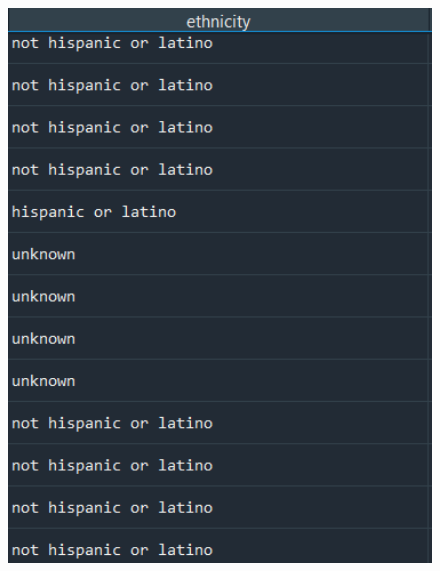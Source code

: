 \documentclass[onecolumn]{article}
\begin{document}
\begin{figure}[h]
    \centering
    \begin{minipage}{0.4\textwidth}
        \centering
        \includegraphics[width=1.42\textwidth]{before_encoding.png} %
    \end{minipage}\hfill
    \begin{minipage}{0.39\textwidth}
        \centering

\end{minipage}
\end{figure}
\end{document}
